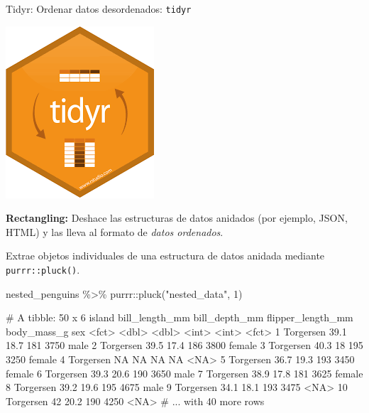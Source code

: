\documentclass[
  ignorenonframetext,
  aspectratio=169]{beamer}
\newenvironment{Shaded}{\begin{snugshade}}{\end{snugshade}}
\newcommand{\DecValTok}[1]{\textcolor[rgb]{0.00,0.00,0.81}{#1}}
\newcommand{\FunctionTok}[1]{\textcolor[rgb]{0.00,0.00,0.00}{#1}}
\newcommand{\NormalTok}[1]{#1}
\newcommand{\SpecialCharTok}[1]{\textcolor[rgb]{0.00,0.00,0.00}{#1}}
\newcommand{\StringTok}[1]{\textcolor[rgb]{0.31,0.60,0.02}{#1}}
\let\oldverbatim\verbatim
\let\endoldverbatim\endverbatim
\renewenvironment{verbatim}{\tiny\oldverbatim}{\endoldverbatim}
\begin{document}
\begin{frame}[fragile]{Tidyr: Ordenar datos desordenados:
\texttt{tidyr}}
\protect\hypertarget{tidyr-ordenar-datos-desordenados-tidyr-4}{}
\begin{flushright}\includegraphics[width=0.05\linewidth]{Imgs/logo_tidyr} \end{flushright}

\textbf{Rectangling:} Deshace las estructuras de datos anidados (por
ejemplo, JSON, HTML) y las lleva al formato de \emph{datos ordenados}.

Extrae objetos individuales de una estructura de datos anidada mediante
\texttt{purrr::pluck()}.

\begin{Shaded}
\begin{Highlighting}[]
\NormalTok{nested\_penguins }\SpecialCharTok{\%\textgreater{}\%}\NormalTok{ purrr}\SpecialCharTok{::}\FunctionTok{pluck}\NormalTok{(}\StringTok{"nested\_data"}\NormalTok{, }\DecValTok{1}\NormalTok{)}
\end{Highlighting}
\end{Shaded}

\begin{verbatim}
# A tibble: 50 x 6
   island    bill_length_mm bill_depth_mm flipper_length_mm body_mass_g sex   
   <fct>              <dbl>         <dbl>             <int>       <int> <fct> 
 1 Torgersen           39.1          18.7               181        3750 male  
 2 Torgersen           39.5          17.4               186        3800 female
 3 Torgersen           40.3          18                 195        3250 female
 4 Torgersen           NA            NA                  NA          NA <NA>  
 5 Torgersen           36.7          19.3               193        3450 female
 6 Torgersen           39.3          20.6               190        3650 male  
 7 Torgersen           38.9          17.8               181        3625 female
 8 Torgersen           39.2          19.6               195        4675 male  
 9 Torgersen           34.1          18.1               193        3475 <NA>  
10 Torgersen           42            20.2               190        4250 <NA>  
# ... with 40 more rows
\end{verbatim}
\end{frame}
\end{document}
